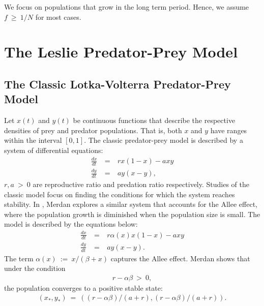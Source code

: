 \documentclass[11pt,reqno]{amsart}
\numberwithin{equation}{section}
\theoremstyle{plain}
\begin{document}
We focus on populations that grow in the long term period. Hence, we assume $f \ \geq \ 1/N$ for most cases. 

% 

\section{The Leslie Predator-Prey Model}

\subsection{The Classic 
Lotka-Volterra Predator-Prey Model}
Let $x(t)$ and $y(t)$ be continuous functions 
that describe the respective densities of prey and predator populations. That is, both $x$ and $y$ have ranges within the interval $[0, 1]$. The classic predator-prey model is described by a system of differential equations:
\begin{eqnarray}
    \frac{dx}{dt} & \ = \  & 
    rx(1-x) - axy \nonumber\\ 
    \frac {dy}{dt} & \ = \ & 
    ay(x-y),
\end{eqnarray}
$r, a \ > \  0 $ are reproductive ratio and predation ratio respectively. 
Studies of the classic model focus on finding the conditions for which the system reaches stability. In \cite{Mer10}, Merdan explores a 
similar system that accounts for the Allee effect, where the population growth is diminished when the population size is small. The model is described by the equations below:
\begin{eqnarray}
    \frac {dx}{dt} &\  =  \ & r\alpha(x) x (1-x) - axy \nonumber \\ 
    \frac {dy}{dt} & \ = \ & ay(x - y).
\end{eqnarray}
The term $\alpha(x) \ := \ x/(\beta + x)$ captures the Allee effect. Merdan shows that under the condition 
\begin{eqnarray}
    r - \alpha \beta  \ > \ 0,
\end{eqnarray}
the population converges to a 
positive stable state:
\begin{eqnarray}
    (x_*, y_*) \ = \ ((r - \alpha\beta)/(a + r), (r-\alpha\beta)/(a + r)).
\end{eqnarray}
\end{document}
